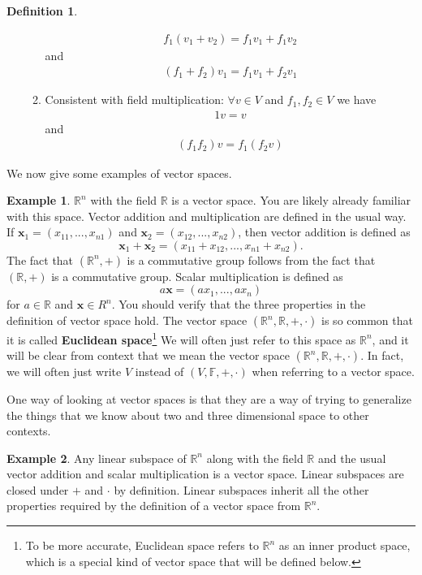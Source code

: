 \documentclass[12pt,reqno]{amsart}
\def\F{\mathbb{F}}
\def\R{\mathbb{R}}
\theoremstyle{definition}
\newtheorem{definition}{Definition}[section]
\newtheorem{example}{Example}[section]
\begin{document}
\begin{definition}
\begin{enumerate}
\begin{enumerate}
\begin{align*}
        f_1 (v_1 + v_2) = f_1 v_1 + f_1 v_2 
      \end{align*}
      and 
      \begin{align*}
        (f_1 + f_2)v_1 = f_1 v_1 + f_2 v_1
      \end{align*}
    \item Consistent with field multiplication: $\forall v \in V$ and
      $f_1, f_2 \in V$ we have
      \begin{align*}
        1 v = v
      \end{align*}
      and 
      \begin{align*}
        (f_1 f_2) v =f_1 (f_2 v)
      \end{align*}
    \end{enumerate}
  \end{enumerate}
\end{definition}
We now give some examples of vector spaces. 
\begin{example} \label{ex:Rn}
  $\R^n$ with the field $\R$ is a vector space. You are likely already
  familiar with this space. Vector addition and multiplication are
  defined in the usual way. If $\mathbf{x}_1 = (x_{11}, ..., x_{n1})$
  and $\mathbf{x}_2 = (x_{12}, ..., x_{n2})$, then vector addition is
  defined as
  \[ \mathbf{x}_1 + \mathbf{x}_2 = (x_{11}+x_{12}, ... , x_{n1} +
  x_{n2}). \]
  The fact that $(\R^n,+)$ is a commutative group follows from the
  fact that $(\R,+)$ is a commutative group. Scalar multiplication is
  defined as
  \[ a \mathbf{x} = (a x_1, ..., ax_n) \] for $a \in \R$ and
  $\mathbf{x} \in R^n$. You should verify that the three properties in
  the definition of vector space hold.  The vector space $(\R^n, \R,
  +, \cdot)$ is so common that it is called \textbf{Euclidean
    space}\footnote{To be more accurate, Euclidean space refers to
    $\R^n$ as an inner product space, which is a special kind of
    vector space that will be defined below.} We will often just refer
  to this space as $\R^n$, and it will be clear from context that we
  mean the vector space $(\R^n, \R, + , \cdot)$. In fact, we will
  often just write $V$ instead of $(V,\F,+,\cdot)$ when referring to a
  vector space.
\end{example}
One way of looking at vector spaces is that they are a way of trying
to generalize the things that we know about two and three dimensional
space to other contexts. 
\begin{example}
  Any linear subspace of $\R^n$ along with the field
  $\R$ and the usual vector addition and scalar multiplication is a
  vector space. Linear subspaces are closed under $+$ and $\cdot$ by
  definition. Linear subspaces inherit all the other properties
  required by the definition of a vector space from $\R^n$.
\end{example}
\end{document}

